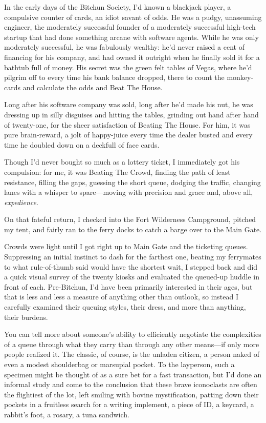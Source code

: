 In the early days of the Bitchun Society, I'd known a blackjack
player, a compulsive counter of cards, an idiot savant of odds. He
was a pudgy, unassuming engineer, the moderately successful founder
of a moderately successful high-tech startup that had done
something arcane with software agents. While he was only moderately
successful, he was fabulously wealthy: he'd never raised a cent of
financing for his company, and had owned it outright when he
finally sold it for a bathtub full of money. His secret was the
green felt tables of Vegas, where he'd pilgrim off to every time
his bank balance dropped, there to count the monkey-cards and
calculate the odds and Beat The House.

Long after his software company was sold, long after he'd made his
nut, he was dressing up in silly disguises and hitting the tables,
grinding out hand after hand of twenty-one, for the sheer
satisfaction of Beating The House. For him, it was pure
brain-reward, a jolt of happy-juice every time the dealer busted
and every time he doubled down on a deckfull of face cards.

Though I'd never bought so much as a lottery ticket, I immediately
got his compulsion: for me, it was Beating The Crowd, finding the
path of least resistance, filling the gaps, guessing the short
queue, dodging the traffic, changing lanes with a whisper to
spare—moving with precision and grace and, above all,
\emph{expedience}.

On that fateful return, I checked into the Fort Wilderness
Campground, pitched my tent, and fairly ran to the ferry docks to
catch a barge over to the Main Gate.

Crowds were light until I got right up to Main Gate and the
ticketing queues. Suppressing an initial instinct to dash for the
farthest one, beating my ferrymates to what rule-of-thumb said
would have the shortest wait, I stepped back and did a quick visual
survey of the twenty kiosks and evaluated the queued-up huddle in
front of each. Pre-Bitchun, I'd have been primarily interested in
their ages, but that is less and less a measure of anything other
than outlook, so instead I carefully examined their queuing styles,
their dress, and more than anything, their burdens.

You can tell more about someone's ability to efficiently negotiate
the complexities of a queue through what they carry than through
any other means—if only more people realized it. The classic, of
course, is the unladen citizen, a person naked of even a modest
shoulderbag or marsupial pocket. To the layperson, such a specimen
might be thought of as a sure bet for a fast transaction, but I'd
done an informal study and come to the conclusion that these brave
iconoclasts are often the flightiest of the lot, left smiling with
bovine mystification, patting down their pockets in a fruitless
search for a writing implement, a piece of ID, a keycard, a
rabbit's foot, a rosary, a tuna sandwich.


